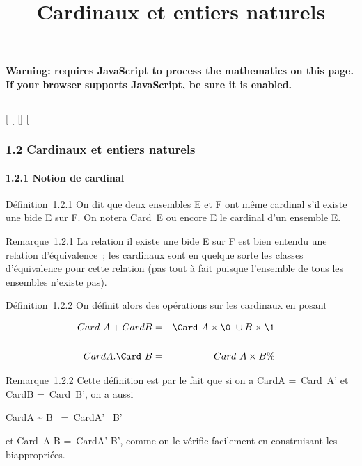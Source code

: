 \documentclass[]{article}
\title{Cardinaux et entiers naturels}
\author{}
\date{}
\begin{document}
\maketitle

\textbf{Warning: 
requires JavaScript to process the mathematics on this page.\\ If your
browser supports JavaScript, be sure it is enabled.}

\begin{center}\rule{3in}{0.4pt}\end{center}

{[}
{[}
{[}{]}
{[}

\subsubsection{1.2 Cardinaux et entiers naturels}

\paragraph{1.2.1 Notion de cardinal}

Définition~1.2.1 On dit que deux ensembles E et F ont même cardinal s'il
existe une bi\jmathection de E sur F. On notera
Card~E ou encore \textbar{}E\textbar{} le
cardinal d'un ensemble E.

Remarque~1.2.1 La relation il existe une bi\jmathection de E sur F est bien
entendu une relation d'équivalence~; les cardinaux sont en quelque sorte
les classes d'équivalence pour cette relation (pas tout à fait puisque
l'ensemble de tous les ensembles n'existe pas).

Définition~1.2.2 On définit alors des opérations sur les cardinaux en
posant

\begin{align*} Card~A
+ CardB& =& \Card~A
\times\0\ \cup B
\times\1\\%
\\
CardA.\Card~B& =&
Card~A \times B \%&
\\ \end{align*}

Remarque~1.2.2 Cette définition est  par le fait que si on a
CardA =\ Card~A' et
CardB =\ Card~B', on a
aussi

CardA \times\0\~ \cup
B \times\1\ =\
CardA' \times\0\ \cup B'
\times\1\

et Card~A \times B =\
CardA' \times B', comme on le vérifie facilement en construisant les
bi\jmathections appropriées.
\end{document}
